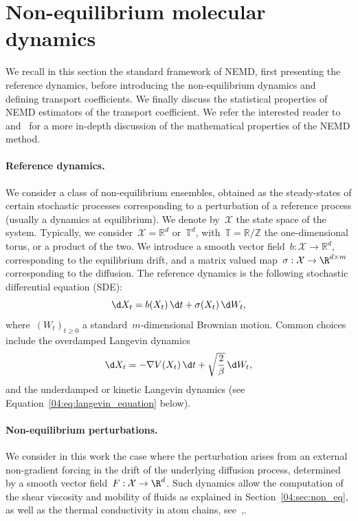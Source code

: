 \section{Non-equilibrium molecular dynamics}\label{04:sec:nemd}
We recall in this section the standard framework of NEMD, first presenting the reference dynamics, before introducing the non-equilibrium dynamics and defining transport coefficients. We finally discuss the statistical properties of NEMD estimators of the transport coefficient. We refer the interested reader to~\cite[Section 5]{LS16} and~\cite{SS23} for a more in-depth discussion of the mathematical properties of the NEMD method.
\paragraph{Reference dynamics.}\label{04:par:ref}
We consider a class of non-equilibrium ensembles, obtained as the steady-states of certain stochastic processes corresponding to a perturbation of a reference process (usually a dynamics at equilibrium).
 We denote by~$\mathcal X$ the state space of the system.
Typically, we consider~$\mathcal X= \mathbb{R}^d$ or~$\mathbb{T}^d$, with~$\mathbb{T}= \mathbb{R}/\mathbb{Z}$ the one-dimensional torus, or a product of the two. We introduce a smooth vector field~$b: \mathcal{X}\to \mathbb{R}^d$, corresponding to the equilibrium drift, and a matrix valued map~$\sigma : \mathcal X\to \R^{d\times m}$ corresponding to the diffusion.
The reference dynamics is the following stochastic differential equation (SDE):
\begin{equation}
    \d X_t = b(X_t)\,\d t +\sigma(X_t)\,\d W_t,
\end{equation}
where~$(W_t)_{t\geq 0}$ a standard~$m$-dimensional Brownian motion.
Common choices include the overdamped Langevin dynamics
\[\d X_t = -\nabla V(X_t)\,\d t + \sqrt{\frac{2}{\beta}}\,\d W_t,\]
and the underdamped or kinetic Langevin dynamics (see Equation~\eqref{04:eq:langevin_equation} below).

\paragraph{Non-equilibrium perturbations.}\label{04:par:neq}
We consider in this work the case where the perturbation arises from an external non-gradient forcing in the drift of the underlying diffusion process, determined by a smooth vector field~$F:\mathcal{X}\to \R^d$.
Such dynamics allow the computation of the shear viscosity and mobility of fluids as explained in Section~\ref{04:sec:non_eq}, as well as the thermal conductivity in atom chains, see~\cite{L07},\cite{ZIE00}.

